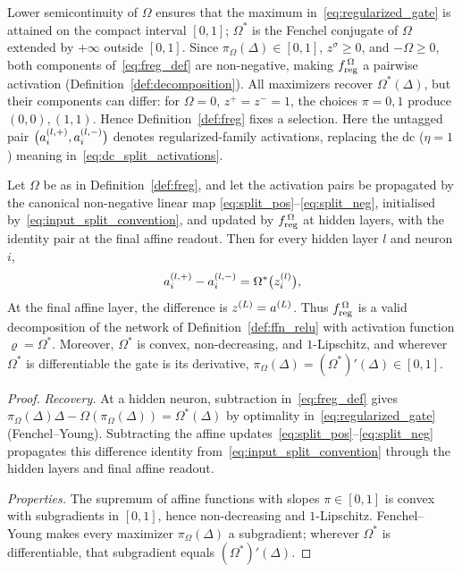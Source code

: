 Lower semicontinuity of $\Omega$ ensures that the maximum in~\eqref{eq:regularized_gate} is attained on the compact interval $[0,1]$; $\Omega^*$ is the Fenchel conjugate of $\Omega$ extended by $+\infty$ outside $[0,1]$. Since $\pi_\Omega(\Delta) \in [0,1]$, $z^\sigma \ge 0$, and $-\Omega \ge 0$, both components of~\eqref{eq:freg_def} are non-negative, making $f_{\mathrm{reg}}^{\,\Omega}$ a pairwise activation (Definition~\ref{def:decomposition}). All maximizers recover $\Omega^*(\Delta)$, but their components can differ: for $\Omega=0$, $z^+=z^-=1$, the choices $\pi=0,1$ produce $(0,0),(1,1)$. Hence Definition~\ref{def:freg} fixes a selection. Here the untagged pair $\bigl(a^{(l,+)}_i, a^{(l,-)}_i\bigr)$ denotes regularized-family activations, replacing the \ac{dc} ($\eta=1$) meaning in~\eqref{eq:dc_split_activations}.

\begin{theoremenv}\label{thm:freg_validity}
Let $\Omega$ be as in Definition~\ref{def:freg}, and let the activation pairs be propagated by the canonical non-negative linear map \eqref{eq:split_pos}--\eqref{eq:split_neg}, initialised by~\eqref{eq:input_split_convention}, and updated by $f_{\mathrm{reg}}^{\,\Omega}$ at hidden layers, with the identity pair at the final affine readout. Then for every hidden layer $l$ and neuron $i$,
\begin{equation}
	a^{(l,+)}_i - a^{(l,-)}_i = \Omega^*\bigl(z^{(l)}_i\bigr),
	\label{eq:freg_recovery}
\end{equation}
At the final affine layer, the difference is $z^{(L)}=a^{(L)}$. Thus $f_{\mathrm{reg}}^{\,\Omega}$ is a valid decomposition of the network of Definition~\ref{def:ffn_relu} with activation function $\varrho = \Omega^*$. Moreover, $\Omega^*$ is convex, non-decreasing, and $1$-Lipschitz, and wherever $\Omega^*$ is differentiable the gate is its derivative, $\pi_\Omega(\Delta) = (\Omega^*)'(\Delta) \in [0,1]$.\end{theoremenv}

\begin{proof}
\emph{Recovery.} At a hidden neuron, subtraction in~\eqref{eq:freg_def} gives $\pi_\Omega(\Delta)\Delta-\Omega(\pi_\Omega(\Delta))=\Omega^*(\Delta)$ by optimality in~\eqref{eq:regularized_gate} (Fenchel--Young). Subtracting the affine updates~\eqref{eq:split_pos}--\eqref{eq:split_neg} propagates this difference identity from~\eqref{eq:input_split_convention} through the hidden layers and final affine readout.

\emph{Properties.} The supremum of affine functions with slopes $\pi\in[0,1]$ is convex with subgradients in $[0,1]$, hence non-decreasing and $1$-Lipschitz. Fenchel--Young makes every maximizer $\pi_\Omega(\Delta)$ a subgradient; wherever $\Omega^*$ is differentiable, that subgradient equals $(\Omega^*)'(\Delta)$.
\end{proof}

